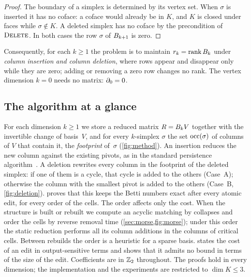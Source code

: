 \begin{proof}
The boundary of a simplex is determined by its vertex set. When $\sigma$ is
inserted it has no coface: a coface would already be in $K$, and $K$ is closed
under faces while $\sigma\notin K$. A deleted simplex has no coface by the
precondition of $\textup{\textsc{Delete}}$. In both cases the row $\sigma$ of $B_{k+1}$ is zero.
\end{proof}

Consequently, for each $k\ge1$ the problem is to maintain $r_k=\operatorname{rank}B_{k}$ under
\emph{column insertion and column deletion}, where rows appear and disappear
only while they are zero; adding or removing a zero row changes no rank. The
vertex dimension $k=0$ needs no matrix: $\partial_0=0$.

\subsection{The algorithm at a glance}\label{sec:approach}

For each dimension $k\ge1$ we store a reduced matrix $R=B_{k}V$ together with
the invertible change of basis~$V$, and for every $k$-simplex $\sigma$ the set
$\operatorname{occ}(\sigma)$ of columns of $V$ that contain it, the \emph{footprint}
of~$\sigma$ (\cref{fig:method}). An insertion reduces the new column against the
existing pivots, as in the standard persistence
algorithm~\cite{edelsbrunner2002topological,zomorodian2005computing}. A deletion
rewrites every column in the footprint of the deleted simplex: if one of them is
a cycle, that cycle is added to the others (Case~A); otherwise the column with
the smallest pivot is added to the others (Case~B, \cref{fig:deletion}).
 proves that
this keeps the Betti numbers exact after every atomic edit, for every order of
the cells. The order affects only the cost. When the structure is built or
rebuilt we compute an acyclic matching by collapses and order the cells by
reverse removal time (\cref{sec:morse,fig:morse}); under this order the static reduction
performs all its column additions in the columns of critical cells. Between
rebuilds the order is a heuristic for a sparse basis. 
states the cost of an edit in output-sensitive terms and shows that it admits no
bound in terms of the size of the edit. Coefficients are in $\mathbb{Z}_2$ throughout. The
proofs hold in every dimension; the implementation and the experiments are
restricted to $\dim K\le3$.

